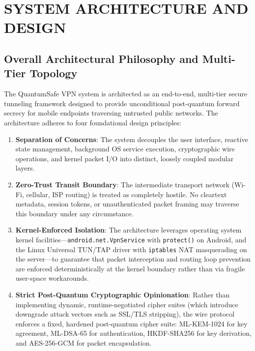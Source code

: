 
\chapter{SYSTEM ARCHITECTURE AND DESIGN}
\label{chap:system_design}

\section{Overall Architectural Philosophy and Multi-Tier Topology}
\label{sec:overall_architecture_philosophy}

The QuantumSafe VPN system is architected as an end-to-end, multi-tier secure tunneling framework designed to provide unconditional post-quantum forward secrecy for mobile endpoints traversing untrusted public networks. The architecture adheres to four foundational design principles:

\begin{enumerate}
    \item \textbf{Separation of Concerns}: The system decouples the user interface, reactive state management, background OS service execution, cryptographic wire operations, and kernel packet I/O into distinct, loosely coupled modular layers.
    \item \textbf{Zero-Trust Transit Boundary}: The intermediate transport network (Wi-Fi, cellular, ISP routing) is treated as completely hostile. No cleartext metadata, session tokens, or unauthenticated packet framing may traverse this boundary under any circumstance.
    \item \textbf{Kernel-Enforced Isolation}: The architecture leverages operating system kernel facilities---\texttt{android.net.VpnService} with \texttt{protect()} on Android, and the Linux Universal TUN/TAP driver with \texttt{iptables} NAT masquerading on the server---to guarantee that packet interception and routing loop prevention are enforced deterministically at the kernel boundary rather than via fragile user-space workarounds.
    \item \textbf{Strict Post-Quantum Cryptographic Opinionation}: Rather than implementing dynamic, runtime-negotiated cipher suites (which introduce downgrade attack vectors such as SSL/TLS stripping), the wire protocol enforces a fixed, hardened post-quantum cipher suite: ML-KEM-1024 for key agreement, ML-DSA-65 for authentication, HKDF-SHA256 for key derivation, and AES-256-GCM for packet encapsulation.
\end{enumerate}

